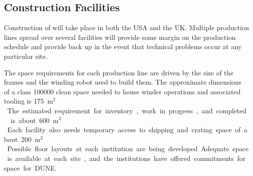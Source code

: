 



\subsection{ Construction Facilities}
\label{sec:fdsp-apa-prod-facility}

Construction of   will take place in both the USA and the UK.  Multiple  production lines spread over several facilities will provide some margin on the production schedule and provide back up in the event that technical problems occur at any particular site. 

The space requirements for each production line are driven by the size of the  frames and the winding robot used to build them. The approximate dimensions of a class \num{100000} clean space needed to house winder operations and associated tooling is \SI{175}{m$^2$}. The estimated requirement for inventory, work in progress, and completed  is about \SI{600}{m$^2$}. Each facility  also needs temporary access to shipping and crating space of about \SI{200}{m$^2$}. Possible floor layouts at each institution are being developed. Adequate space is available at each site, and the institutions have offered commitments for space for DUNE. 


